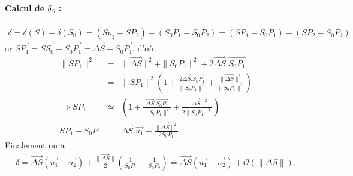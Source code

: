 \documentclass[12pt,prb,aps,epsf]{report}
\begin{document}
\paragraph{Calcul de $\delta_S$ :}
\begin{eqnarray}
\delta = \delta(S)-\delta(S_0) = (Sp_1-SP_2)-(S_0P_1-S_0P_2) = (SP_1-S_0P_1)-(SP_2-S_0P_2)
\end{eqnarray}
or $\vec{SP_1} = \vec{SS_0} + \vec{S_0P_1}= \vec{\Delta S} + \vec{S_0P_1}$, d'où
\begin{eqnarray}
\|SP_1\|^2&=&\|\vec{\Delta S}\|^2+\|S_0P_1\|^2+2\vec{\Delta S}.\vec{S_0P_1}\\
&=& \|SP_1\|^2\left(1+\frac{2\vec{\Delta S}.\vec{S_0P_1}}{\|S_0P_1\|^2}+\frac{\|\vec{\Delta S}\|^2}{\|S_0P_1\|^2}\right)\\
\Rightarrow SP_1 &\simeq& \left(1+\frac{\vec{\Delta S}.\vec{S_0P_1}}{\|S_0P_1\|^2}+\frac{\|\vec{\Delta S}\|^2}{2\|S_0P_1\|^2}\right)\\
SP_1-S_0P_1 &=& \vec{\Delta S}.\vec{u_1} +  \frac{\|\vec{\Delta S}\|^2}{2S_0P_1}
\end{eqnarray}
Finalement on a 
\begin{eqnarray}
\delta = \vec{\Delta S}(\vec{u_1}-\vec{u_2}) + \frac{\|\vec{\Delta S}\|}{2}\left(\frac{1}{S_0P_1}-\frac{1}{S_0P_2}\right) = \vec{\Delta S}(\vec{u_1}-\vec{u_2}) + \mathcal{O}(\|\Delta S\|).
\end{eqnarray}
\end{document}
